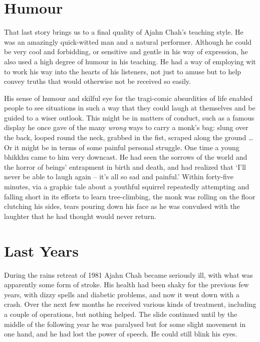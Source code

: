 \section*{Humour}

That last story brings us to a final quality of Ajahn Chah's teaching style. He was an amazingly quick-witted man and a natural performer. Although he could be very cool and forbidding, or sensitive and gentle in his way of expression, he also used a high degree of humour in his teaching. He had a way of employing wit to work his way into the hearts of his listeners, not just to amuse but to help convey truths that would otherwise not be received so easily.

His sense of humour and skilful eye for the tragi-comic absurdities of life enabled people to see situations in such a way that they could laugh at themselves and be guided to a wiser outlook. This might be in matters of conduct, such as a famous display he once gave of the many \textit{wrong} ways to carry a monk's bag: slung over the back, looped round the neck, grabbed in the fist, scraped along the ground \ldots{} Or it might be in terms of some painful personal struggle. One time a young bhikkhu came to him very downcast. He had seen the sorrows of the world and the horror of beings' entrapment in birth and death, and had realized that `I'll never be able to laugh again -- it's all so sad and painful.' Within forty-five minutes, via a graphic tale about a youthful squirrel repeatedly attempting and falling short in its efforts to learn tree-climbing, the monk was rolling on the floor clutching his sides, tears pouring down his face as he was convulsed with the laughter that he had thought would never return.
\vspace*{0.4\baselineskip}

\section*{Last Years}

\vspace*{0.4\baselineskip}
During the rains retreat of 1981 Ajahn Chah became seriously ill, with what was apparently some form of stroke. His health had been shaky for the previous few years, with dizzy spells and diabetic problems, and now it went down with a crash. Over the next few months he received various kinds of treatment, including a couple of operations, but nothing helped. The slide continued until by the middle of the following year he was paralysed but for some slight movement in one hand, and he had lost the power of speech. He could still blink his eyes.

